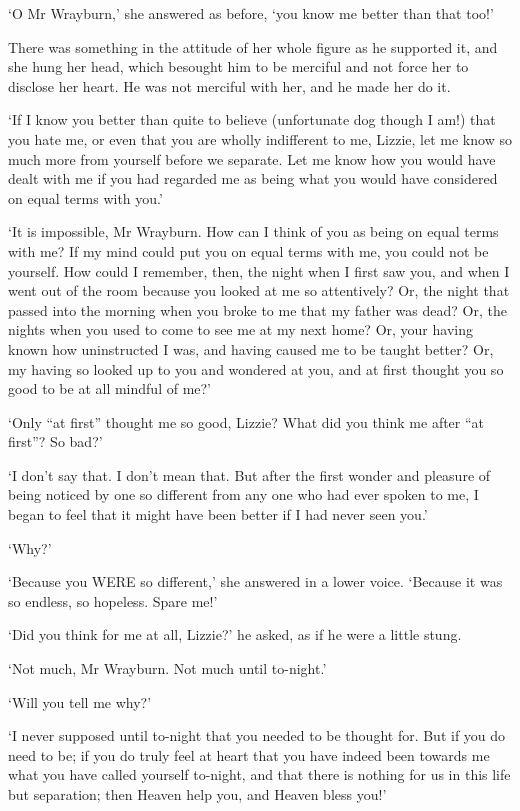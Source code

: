 ‘O Mr Wrayburn,’ she answered as before, ‘you know me better than that
too!’

There was something in the attitude of her whole figure as he supported
it, and she hung her head, which besought him to be merciful and not
force her to disclose her heart. He was not merciful with her, and he
made her do it.

‘If I know you better than quite to believe (unfortunate dog though I
am!) that you hate me, or even that you are wholly indifferent to me,
Lizzie, let me know so much more from yourself before we separate. Let
me know how you would have dealt with me if you had regarded me as being
what you would have considered on equal terms with you.’

‘It is impossible, Mr Wrayburn. How can I think of you as being on equal
terms with me? If my mind could put you on equal terms with me, you
could not be yourself. How could I remember, then, the night when I
first saw you, and when I went out of the room because you looked at
me so attentively? Or, the night that passed into the morning when you
broke to me that my father was dead? Or, the nights when you used to
come to see me at my next home? Or, your having known how uninstructed
I was, and having caused me to be taught better? Or, my having so looked
up to you and wondered at you, and at first thought you so good to be at
all mindful of me?’

‘Only “at first” thought me so good, Lizzie? What did you think me after
“at first”? So bad?’

‘I don’t say that. I don’t mean that. But after the first wonder and
pleasure of being noticed by one so different from any one who had ever
spoken to me, I began to feel that it might have been better if I had
never seen you.’

‘Why?’

‘Because you WERE so different,’ she answered in a lower voice. ‘Because
it was so endless, so hopeless. Spare me!’

‘Did you think for me at all, Lizzie?’ he asked, as if he were a little
stung.

‘Not much, Mr Wrayburn. Not much until to-night.’

‘Will you tell me why?’

‘I never supposed until to-night that you needed to be thought for. But
if you do need to be; if you do truly feel at heart that you have indeed
been towards me what you have called yourself to-night, and that there
is nothing for us in this life but separation; then Heaven help you, and
Heaven bless you!’

